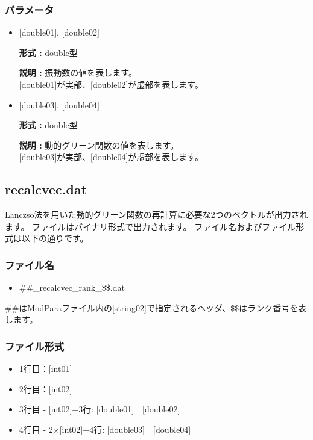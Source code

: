 \subsubsection{パラメータ}
 \begin{itemize}

 \item  $[$double01$]$, $[$double02$]$

 {\bf 形式 :} double型 

 {\bf 説明 :} 振動数の値を表します。\\
$[$double01$]$が実部、$[$double02$]$が虚部を表します。\\

 \item  $[$double03$]$, $[$double04$]$

 {\bf 形式 :} double型 

 {\bf 説明 :} 動的グリーン関数の値を表します。\\
$[$double03$]$が実部、$[$double04$]$が虚部を表します。\\

\end{itemize}


\newpage
\subsection{{recalcvec.dat}}
Lanczso法を用いた動的グリーン関数の再計算に必要な2つのベクトルが出力されます。
ファイルはバイナリ形式で出力されます。
ファイル名およびファイル形式は以下の通りです。

\subsubsection{ファイル名}
\begin{itemize}
   \item{\#\#\_recalcvec\_rank\_\$\$.dat}
\end{itemize}
  \#\#はModParaファイル内の[string02]で指定されるヘッダ、\$\$はランク番号を表します。

\subsubsection{ファイル形式}
 \begin{itemize}
   \item  1行目：$[$int01$]$
   \item  2行目：$[$int02$]$
   \item  3行目 - $[$int02$]$+3行: $[$double01$]$~~$[$double02$]$
   \item  4行目 - 2$\times$$[$int02$]$+4行: $[$double03$]$~~$[$double04$]$
  \end{itemize}
